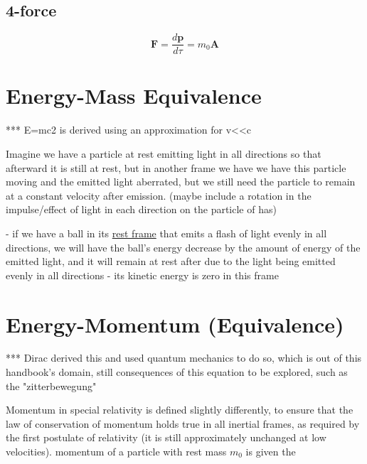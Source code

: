 \subsection{4-force}

\begin{equation}
	\mathbf{F}= \frac{d\mathbf{p}}{d\tau} = m_0\mathbf{A}
\end{equation}

\section{Energy-Mass Equivalence}

*** E=mc2 is derived using an approximation for v<<c

Imagine we have a particle at rest emitting light in all directions so that afterward it is still at rest, but in another frame we have we have this particle moving and the emitted light aberrated, but we still need the particle to remain at a constant velocity after emission. (maybe include a rotation in the impulse/effect of light in each direction on the particle of has)

- if we have a ball in its \hyperlink{def-proper-frame}{rest frame} that emits a flash of light evenly in all directions, we will have the ball's energy decrease by the amount of energy of the emitted light, and it will remain at rest after due to the light being emitted evenly in all directions
- its kinetic energy is zero in this frame

\section{Energy-Momentum (Equivalence)}

*** Dirac derived this and used quantum mechanics to do so, which is out of this handbook's domain, still consequences of this equation to be explored, such as the "zitterbewegung"

Momentum in special relativity is defined slightly differently, to ensure that the law of conservation of momentum holds true in all inertial frames, as required by the first postulate of relativity (it is still approximately unchanged at low velocities). momentum of a particle with rest mass $m_0$ is given the

